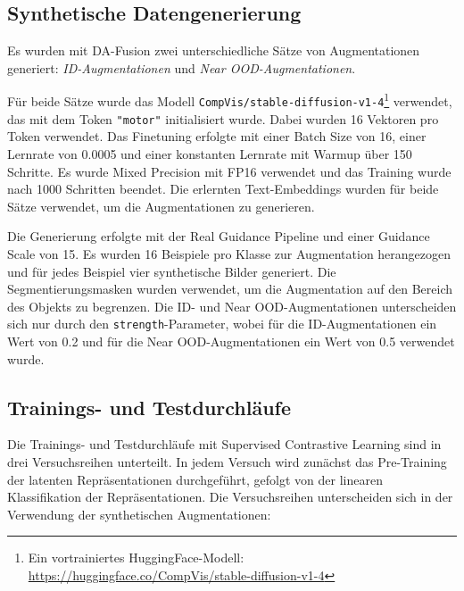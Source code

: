 \subsection{Synthetische Datengenerierung} \label{subsec:da-fusion-setup}

Es wurden mit DA-Fusion zwei unterschiedliche Sätze von Augmentationen generiert: \emph{ID-Augmentationen} und \emph{Near OOD-Augmentationen}.

Für beide Sätze wurde das Modell \lstinline{CompVis/stable-diffusion-v1-4}\footnote{Ein vortrainiertes HuggingFace-Modell: \url{https://huggingface.co/CompVis/stable-diffusion-v1-4}} verwendet, das mit dem Token \lstinline{"motor"} initialisiert wurde. Dabei wurden 16 Vektoren pro Token verwendet. Das Finetuning erfolgte mit einer Batch Size von 16, einer Lernrate von 0.0005 und einer konstanten Lernrate mit Warmup über 150 Schritte. Es wurde Mixed Precision mit FP16 verwendet und das Training wurde nach 1000 Schritten beendet. Die erlernten Text-Embeddings wurden für beide Sätze verwendet, um die Augmentationen zu generieren.

Die Generierung erfolgte mit der Real Guidance Pipeline und einer Guidance Scale von 15. Es wurden 16 Beispiele pro Klasse zur Augmentation herangezogen und für jedes Beispiel vier synthetische Bilder generiert. Die Segmentierungsmasken wurden verwendet, um die Augmentation auf den Bereich des Objekts zu begrenzen. Die ID- und Near OOD-Augmentationen unterscheiden sich nur durch den \lstinline{strength}-Parameter, wobei für die ID-Augmentationen ein Wert von 0.2 und für die Near OOD-Augmentationen ein Wert von 0.5 verwendet wurde.

\subsection{Trainings- und Testdurchläufe} \label{subsec:supcon-setup}

Die Trainings- und Testdurchläufe mit Supervised Contrastive Learning sind in drei Versuchsreihen unterteilt. In jedem Versuch wird zunächst das Pre-Training der latenten Repräsentationen durchgeführt, gefolgt von der linearen Klassifikation der Repräsentationen. Die Versuchsreihen unterscheiden sich in der Verwendung der synthetischen Augmentationen:

